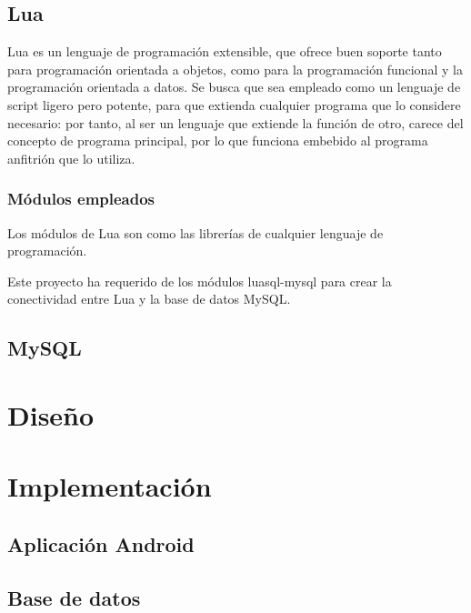     \section{Lua}

        Lua es un lenguaje de programación extensible, que ofrece buen soporte tanto para programación orientada a objetos, como para la programación funcional y la programación orientada a datos. Se busca que sea empleado como un lenguaje de script ligero pero potente, para que extienda cualquier programa que lo considere necesario: por tanto, al ser un lenguaje que extiende la función de otro, carece del concepto de programa principal, por lo que funciona embebido al programa anfitrión que lo utiliza.


        \subsection{Módulos empleados}

            Los módulos de Lua son como las librerías de cualquier lenguaje de programación.

            Este proyecto ha requerido de los módulos luasql-mysql para crear la conectividad entre Lua y la base de datos MySQL.


    \section{MySQL}


\cleardoublepage



\chapter{Diseño}

\cleardoublepage



\chapter{Implementación}

    \section{Aplicación Android}


    \section{Base de datos}


